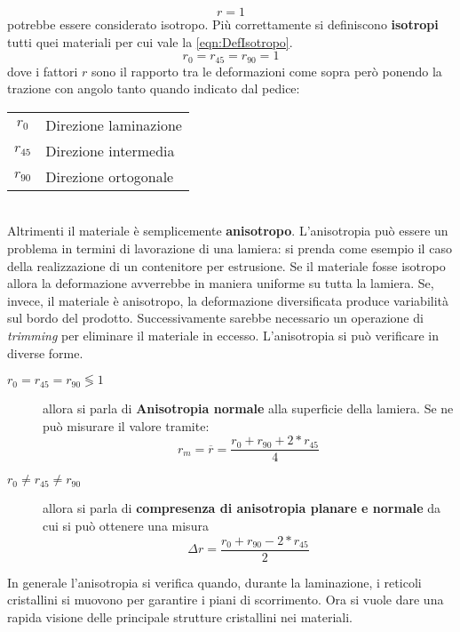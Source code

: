 \begin{equation}
r = 1
\end{equation}
potrebbe essere considerato isotropo. Più correttamente si definiscono \textbf{isotropi} tutti quei materiali per cui vale la \ref{eqn:DefIsotropo}.
\begin{equation}
r_0 = r_{45} = r_{90} = 1
\label{eqn:DefIsotropo}
\end{equation}
dove i fattori $r$ sono il rapporto tra le deformazioni come sopra però ponendo la trazione con angolo tanto quando indicato dal pedice:\\
\begin{tabular}{cl}
$r_0$ & Direzione laminazione\\
$r_{45}$ & Direzione intermedia\\
$r_{90}$ & Direzione ortogonale
\end{tabular}
\\
Altrimenti il materiale è semplicemente \textbf{anisotropo}.
L'anisotropia può essere un problema in termini di lavorazione di una lamiera: si prenda come esempio il caso della realizzazione di un contenitore per estrusione. Se il materiale fosse isotropo allora la deformazione avverrebbe in maniera uniforme su tutta la lamiera.
Se, invece, il materiale è anisotropo, la deformazione diversificata produce variabilità sul bordo del prodotto. Successivamente sarebbe necessario un operazione di \textit{trimming} per eliminare il materiale in eccesso.
L'anisotropia si può verificare in diverse forme.
\begin{description}
\item[$r_0 = r_{45} = r_{90} \lessgtr 1$] allora si parla di \textbf{Anisotropia normale} alla superficie della lamiera. Se ne può misurare il valore tramite:
\begin{equation}
r_m = \overline{r} = \frac{r_0 + r_{90} + 2 * r_{45}}{4}
\label{eqn:MisAnisotropia}
\end{equation}
\item[$r_0 \neq r_{45} \neq r_{90}$] allora si parla di \textbf{compresenza di anisotropia planare e normale} da cui si può ottenere una misura
\begin{equation}
\Delta r = \frac{r_0 + r_{90} - 2 * r_{45}}{2}
\label{eqn:MisPlanare}
\end{equation}
\end{description}
In generale l'anisotropia si verifica quando, durante la laminazione, i reticoli cristallini si muovono per garantire i piani di scorrimento.
Ora si vuole dare una rapida visione delle principale strutture cristallini nei materiali.

